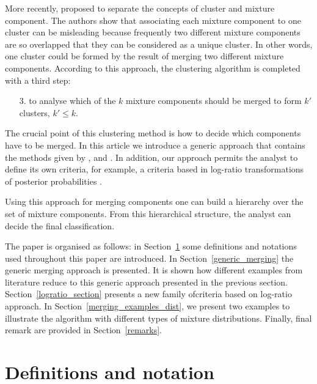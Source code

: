 \documentclass[10pt, a4paper]{article}
\theoremstyle{definition}
\begin{document}
\begin{spacing}{1.9}
More recently, \cite{lee2004combining,hennig2010methods,baudry2010combining,melnykov2013distribution,pastore2013merging} proposed to separate the concepts of cluster and mixture component. The authors show that associating each mixture component to one cluster can be misleading because frequently two different mixture components are so overlapped that they can be considered as a unique cluster. In other words, one cluster could be formed by the result of merging two different mixture components. According to this approach, the clustering algorithm is completed with a third step:

\begin{itemize}
\item[3.] to analyse which of the $k$ mixture components should be merged to form $k'$ clusters, $k' \leq k$.
\end{itemize}

The crucial point of this clustering method is how to decide which components have to be merged. In this article we introduce a generic approach that contains the methods given by \cite{baudry2010combining}, \cite{hennig2010methods} and \cite{longford2014}. In addition, our approach permits the analyst  to define its own criteria, for example, a criteria based in log-ratio transformations of posterior probabilities \citep{aitchison1986statistical}.

Using this approach for merging components one can build a hierarchy over the set of mixture components. From this hierarchical structure, the analyst can decide the final classification.

The paper is organised as follows: in Section~\ref{definitions} some definitions and notations used throughout this paper are introduced. In Section~\ref{generic_merging} the generic merging approach is presented. It is shown how different examples from literature reduce to this generic approach presented in the previous section. Section~\ref{logratio_section} presents a new family ofcriteria based on log-ratio approach. In Section~\ref{merging_examples_dist}, we present two examples to illustrate the algorithm with different types of mixture distributions. Finally, final remark are provided in Section~\ref{remarks}.

\section{Definitions and notation}\label{definitions}


\end{spacing}
\end{document}

